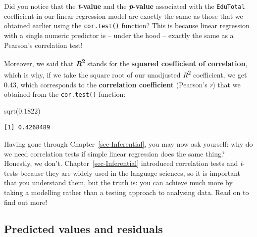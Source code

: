 \documentclass[
  letterpaper,
  DIV=11,
  numbers=noendperiod]{scrreprt}
\newenvironment{Shaded}{\begin{snugshade}}{\end{snugshade}}
\newcommand{\FloatTok}[1]{\textcolor[rgb]{0.68,0.00,0.00}{#1}}
\newcommand{\FunctionTok}[1]{\textcolor[rgb]{0.28,0.35,0.67}{#1}}
\newcommand{\NormalTok}[1]{\textcolor[rgb]{0.00,0.23,0.31}{#1}}
\begin{document}
\begin{tcolorbox}[enhanced jigsaw, arc=.35mm, bottomrule=.15mm, bottomtitle=1mm, breakable, colback=white, colbacktitle=quarto-callout-note-color!10!white, colframe=quarto-callout-note-color-frame, coltitle=black, left=2mm, leftrule=.75mm, opacityback=0, opacitybacktitle=0.6, rightrule=.15mm, title=\textcolor{quarto-callout-note-color}{\faInfo}\hspace{0.5em}{It's all linear regression!~\emoji{exploding-head}}, titlerule=0mm, toprule=.15mm, toptitle=1mm]

Did you notice that the \textbf{\emph{t}-value} and the
\textbf{\emph{p}-value} associated with the \texttt{EduTotal}
coefficient in our linear regression model are exactly the same as those
that we obtained earlier using the \texttt{cor.test()} function? This is
because linear regression with a single numeric predictor is -- under
the hood -- exactly the same as a Pearson's correlation test!

Moreover, we said that \textbf{\emph{R}}\textsuperscript{\textbf{2}}
stands for the \textbf{squared coefficient of correlation}, which is
why, if we take the square root of our unadjusted
\emph{R}\textsuperscript{2} coefficient, we get 0.43, which corresponds
to the \textbf{correlation coefficient} (Pearson's \emph{r}) that we
obtained from the \texttt{cor.test()} function:

\begin{Shaded}
\begin{Highlighting}[]
\FunctionTok{sqrt}\NormalTok{(}\FloatTok{0.1822}\NormalTok{)}
\end{Highlighting}
\end{Shaded}

\begin{verbatim}
[1] 0.4268489
\end{verbatim}

Having gone through Chapter~\ref{sec-Inferential}, you may now ask
yourself: why do we need correlation tests if simple linear regression
does the same thing? Honestly, we don't. Chapter~\ref{sec-Inferential}
introduced correlation tests and \emph{t}-tests because they are widely
used in the language sciences, so it is important that you understand
them, but the truth is: you can achieve much more by taking a modelling
rather than a testing approach to analysing data. Read on to find out
more!

\end{tcolorbox}

\subsection{Predicted values and
residuals}\label{sec-PredictedResiduals}
\end{document}
